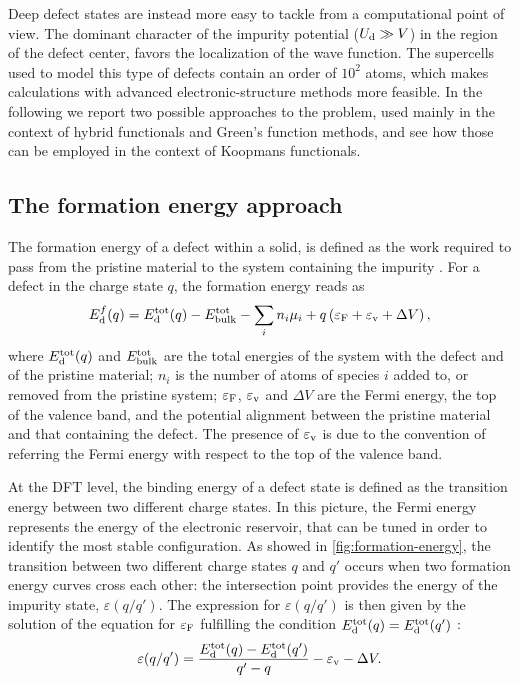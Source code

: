 Deep defect states are instead more easy to tackle from a computational point of view. The dominant character of the impurity potential ($U_{\rm d} \gg V$) in the region of the defect center, favors the localization of the wave function. The supercells used to model this type of defects contain an order of $10^2$ atoms, which makes calculations with advanced electronic-structure methods more feasible. In the following we report two possible approaches to the problem, used mainly in the context of hybrid functionals and Green's function methods, and see how those can be employed in the context of Koopmans functionals.

\subsection{The formation energy approach\label{sec:formation-energy-approach}}
The formation energy of a defect within a solid, is defined as the work required to pass from the pristine material to the system containing the impurity \cite{van_de_walle_first-principles_2004}. For a defect in the charge state $q$, the formation energy reads as
%
\begin{equation}
    E^f_{\rm d}(q) = E^{\rm tot}_{\rm d}(q) - E^{\rm tot}_{\rm bulk} - \sum_i n_i \mu_i + q \left( \varepsilon_{\rm F} + \varepsilon_{\rm v} + \Delta V \right) ,
    \label{eq:formation-energy}
\end{equation}
%
where $E^{\rm tot}_{\rm d}(q)$ and $E^{\rm tot}_{\rm bulk}$ are the total energies of the system with the defect and of the pristine material; $n_i$ is the number of atoms of species $i$ added to, or removed from the pristine system; $\varepsilon_{\rm F}$, $\varepsilon_{\rm v}$ and $\Delta V$ are the Fermi energy, the top of the valence band, and the potential alignment between the pristine material and that containing the defect. The presence of $\varepsilon_{\rm v}$ is due to the convention of referring the Fermi energy with respect to the top of the valence band.

At the DFT level, the binding energy of a defect state is defined as the transition energy between two different charge states. In this picture, the Fermi energy represents the energy of the electronic reservoir, that can be tuned in order to identify the most stable configuration. As showed in \cref{fig:formation-energy}, the transition between two different charge states $q$ and $q'$ occurs when two formation energy curves cross each other: the intersection point provides the energy of the impurity state, $\varepsilon(q/q')$. The expression for $\varepsilon(q/q')$ is then given by the solution of the equation for $\varepsilon_{\rm F}$ fulfilling the condition $E^{\rm tot}_{\rm d}(q) = E^{\rm tot}_{\rm d}(q')$ \cite{chen_first-principles_2015}:
%
\begin{equation}
    \varepsilon(q/q') = \frac{E^{\rm tot}_{\rm d}(q) - E^{\rm tot}_{\rm d}(q')}{q' - q} -\varepsilon_{\rm v} - \Delta V .
    \label{eq:energy-defect-level}
\end{equation}

